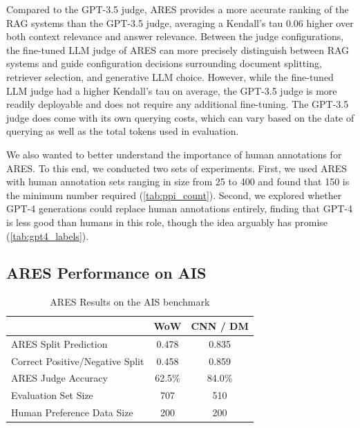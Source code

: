 Compared to the GPT-3.5 judge, ARES provides a more accurate ranking of the RAG systems than the GPT-3.5 judge, averaging a Kendall's tau 0.06 higher over both context relevance and answer relevance.
Between the judge configurations,
the fine-tuned LLM judge of ARES can more precisely distinguish between RAG systems and guide configuration decisions surrounding document splitting, retriever selection, and generative LLM choice.
However, while the fine-tuned LLM judge had a higher Kendall's tau on average, the GPT-3.5 judge is more readily deployable and does not require any additional fine-tuning.
The GPT-3.5 judge does come with its own querying costs, which can vary based on the date of querying as well as the total tokens used in evaluation.

We also wanted to better understand the importance of human annotations for ARES. To this end, we conducted two sets of experiments. First, we used ARES with human annotation sets ranging in size from 25 to 400 and found that 150 is the minimum number required (\autoref{tab:ppi_count}). Second, we explored whether GPT-4 generations could replace human annotations entirely, finding that GPT-4 is less good than humans in this role, though the idea arguably has promise (\autoref{tab:gpt4_labels}).



\subsection{ARES Performance on AIS}
\label{sec:ais}

\begin{table}[htp!]
\centering
\small
\begin{tabular}{lcc}
\toprule
                                                                               & \multicolumn{1}{l}{\textbf{WoW}} & \multicolumn{1}{l}{\textbf{CNN / DM}} \\
                                                                               \midrule
ARES Split Prediction                                                                & 0.478                           & 0.835                                \\
Correct Positive/Negative Split                                                                  & 0.458                           & 0.859                                \\
ARES Judge Accuracy                 & 62.5\%                           & 84.0\%                                \\
Evaluation Set Size                & 707                              & 510                                   \\
Human Preference Data Size & 200 & 200  \\       
\bottomrule
\end{tabular}
\caption{ARES Results on the AIS benchmark}
\label{tab:ais_results}
\end{table}


